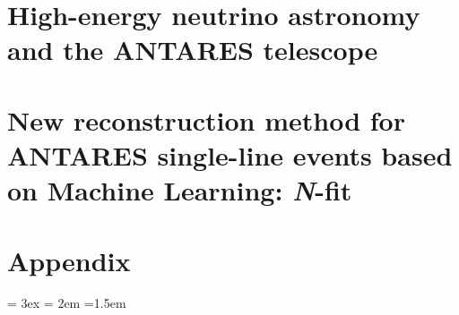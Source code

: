 \documentclass[nocrop, rm, english]{tesisUPV}
\begin{document}

    


\mainmatter




\part{High-energy neutrino astronomy and the ANTARES telescope}
\label{part:1}



\part{New reconstruction method for ANTARES single-line events based on Machine Learning: \emph{N}-fit}
\label{part:2}






\part*{Appendix}
\appendix




\bibitemsep = 3ex
\bibhang = 2em
{\emergencystretch=1.5em
\printbibliography[heading=bibintoc,title=\bibname]}



\end{document}
